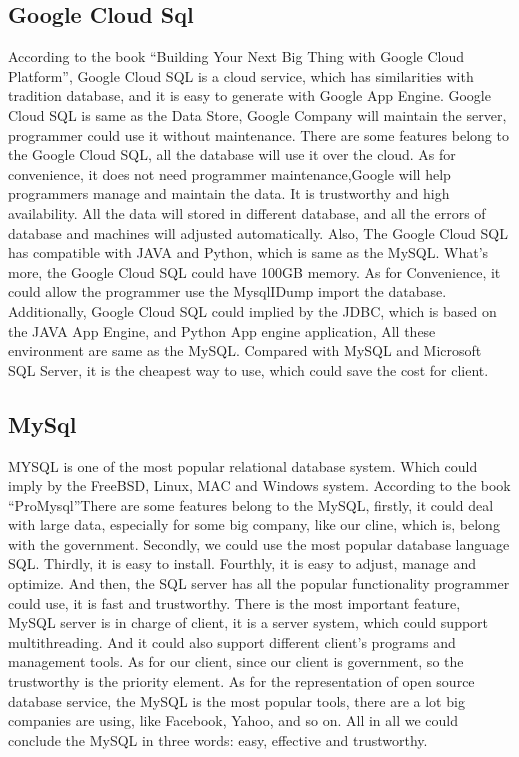 \documentclass[letterpaper,10pt, draftclsnofoot,onecolumn]{IEEEtran}
\begin{document}
{{{{\subsection[Google Cloud Sql]{\color{black}
Google Cloud Sql}
{\color{black}\normalsize\noindent
{According to the book “Building Your Next Big Thing with Google Cloud Platform”\cite{IEEEexample:book3}, Google Cloud SQL is a cloud service, which has similarities with tradition database, and it is easy to generate with Google App Engine. 
Google Cloud SQL is same as the Data Store, Google Company will maintain the server, programmer could use it without maintenance. 
There are some features belong to the Google Cloud SQL, all the database will use it over the cloud. 
As for convenience, it does not need programmer maintenance,Google will help programmers manage and maintain the data.
It is trustworthy and high availability. All the data will stored in different database, and all the errors of database and machines will adjusted automatically. 
Also, The Google Cloud SQL has compatible with JAVA and Python, which is same as the MySQL.
What’s more, the Google Cloud SQL could have 100GB memory. As for Convenience, it could allow the programmer use the MysqlIDump import the database. 
 Additionally, Google Cloud SQL could implied by the JDBC, which is based on the JAVA App Engine, and Python App engine application, All these environment are same as the MySQL.
 Compared with MySQL and Microsoft SQL Server, it is the cheapest way to use, which could save the cost for client.
}

\subsection[MySql]{\color{black}
MySql}
{\color{black}\normalsize\noindent
{MYSQL is one of the most popular relational database system. Which could imply by the FreeBSD, Linux, MAC and Windows system. 
According to the book “ProMysql”\cite{IEEEexample:book4}There are some features belong to the MySQL, firstly, it could deal with large data, especially for some big company, like our cline, which is, belong with the government. 
Secondly, we could use the most popular database language SQL. Thirdly, it is easy to install. Fourthly, it is easy to adjust, manage and optimize. 
And then, the SQL server has all the popular functionality programmer could use, it is fast and trustworthy. There is the most important feature, MySQL server is in charge of client, it is a server system, which could support multithreading. 
And it could also support different client’s programs and management tools. As for our client, since our client is government, so the trustworthy is the priority element.
As for the representation of open source database service, the MySQL is the most popular tools, there are a lot big companies are using, like Facebook, Yahoo, and so on. All in all we could conclude the MySQL in three words: easy, effective and trustworthy. 
}

}}}}}}
\end{document}
